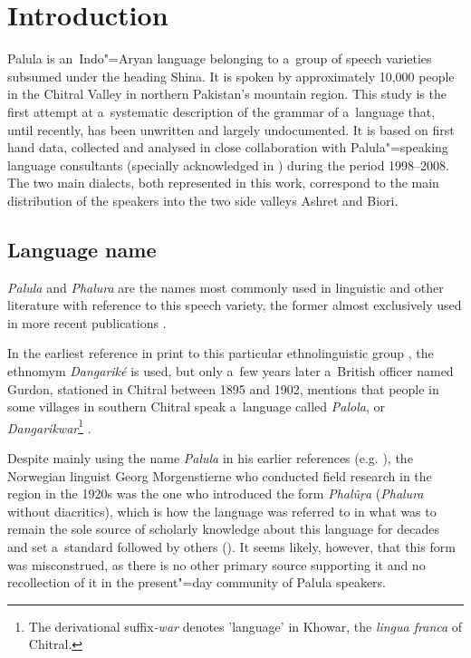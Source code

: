 \chapter{Introduction}
\label{chap:1}

Palula is an~Indo"=Aryan language belonging to a~group of speech varieties subsumed under the heading
Shina. It is spoken by approximately 10,000 people in the Chitral Valley in northern Pakistan's
mountain region. This study is the first attempt at a~systematic description of the grammar of
a~language that, until recently, has been unwritten and largely undocumented. It is based on first
hand data, collected and analysed in close collaboration with Palula"=speaking language consultants
(specially acknowledged in ) during the period 1998--2008. The two main
dialects, both represented in this work, correspond to the main distribution of the speakers into
the two side valleys Ashret and Biori.

\section{Language name}
\label{sec:1-1}

\textit{Palula} and \textit{Phalura} are the names most commonly used in linguistic and other
literature with reference to this speech variety, the former almost exclusively used in more recent
publications \citep{cacopardo2001,bashir2003,schmidtkohistani2008,heegardpetersen2006}. 

In the earliest reference in print to this particular ethnolinguistic group
\citep[64]{biddulph1986}, the ethnomym \textit{Dangariké} is used, but only a~few years later
a~British officer named Gurdon, stationed in Chitral between 1895 and 1902, mentions that people in
some villages in southern Chitral speak a~language called \textit{Palola}, or
\textit{Dangarikwar}\footnote{The derivational suffix\textit{-war} denotes 'language' in Khowar, the
  \textit{lingua franca} of Chitral.} \citep{morgenstierne1941}.


Despite mainly using the name \textit{Palula} in his earlier references
(e.g. \citeyear[54]{morgenstierne1932}), the Norwegian linguist Georg Morgenstierne who conducted
field research in the region in the 1920s was the one who introduced the form \textit{Phalûṛa}
(\textit{Phalura} without diacritics), which is how the language was referred to in what was to
remain the sole source of scholarly knowledge about this language for decades
\citep{morgenstierne1941} and set a~standard followed by others
(\citealt{buddruss1967,edelman1983,masica1991,decker1992a}). It seems likely,
however, that this form was misconstrued, as there is no other primary source supporting it and no
recollection of it in the present"=day community of Palula speakers.


